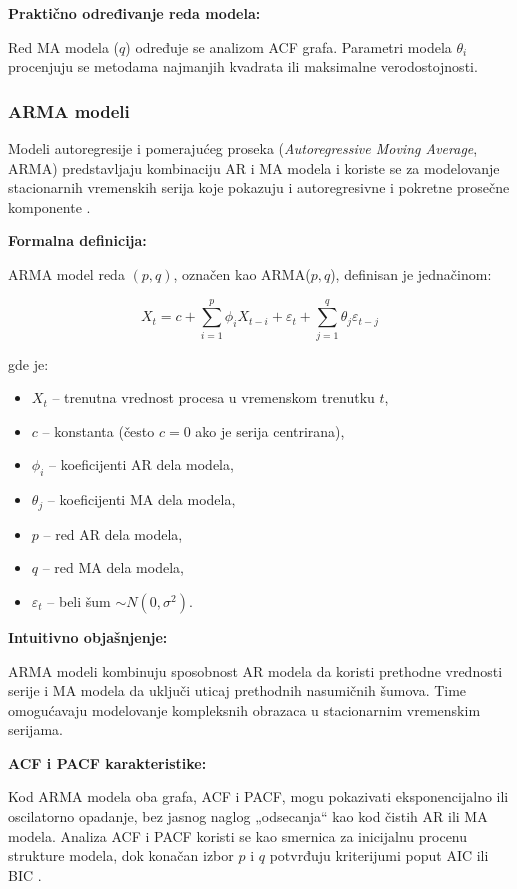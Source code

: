 \documentclass[12pt]{article}
\begin{document}
\noindent\textbf{Praktično određivanje reda modela:}

Red MA modela ($q$) određuje se analizom ACF grafa. Parametri modela $\theta_i$ procenjuju se metodama najmanjih kvadrata ili maksimalne verodostojnosti.

\subsubsection{ARMA modeli}

Modeli autoregresije i pomerajućeg proseka (\textit{Autoregressive Moving Average}, ARMA) predstavljaju kombinaciju AR i MA modela i koriste se za modelovanje stacionarnih vremenskih serija koje pokazuju i autoregresivne i pokretne prosečne komponente \cite{box1970, brockwell2002}.

\textbf{Formalna definicija:}

ARMA model reda $(p,q)$, označen kao ARMA($p,q$), definisan je jednačinom:

\begin{equation}
X_t = c + \sum_{i=1}^{p} \phi_i X_{t-i}
           + \varepsilon_t
           + \sum_{j=1}^{q} \theta_j \varepsilon_{t-j}
\end{equation}

gde je:
\begin{itemize}
    \item $X_t$ -- trenutna vrednost procesa u vremenskom trenutku $t$,
    \item $c$ -- konstanta (često $c=0$ ako je serija centrirana),
    \item $\phi_i$ -- koeficijenti AR dela modela,
    \item $\theta_j$ -- koeficijenti MA dela modela,
    \item $p$ -- red AR dela modela,
    \item $q$ -- red MA dela modela,
    \item $\varepsilon_t$ -- beli šum $\sim N(0, \sigma^2)$.
\end{itemize}

\textbf{Intuitivno objašnjenje:}

ARMA modeli kombinuju sposobnost AR modela da koristi prethodne vrednosti serije i MA modela da uključi uticaj prethodnih nasumičnih šumova. Time omogućavaju modelovanje kompleksnih obrazaca u stacionarnim vremenskim serijama.

\textbf{ACF i PACF karakteristike:}

Kod ARMA modela oba grafa, ACF i PACF, mogu pokazivati eksponencijalno ili oscilatorno opadanje, bez jasnog naglog „odsecanja“ kao kod čistih AR ili MA modela. Analiza ACF i PACF koristi se kao smernica za inicijalnu procenu strukture modela, dok konačan izbor $p$ i $q$ potvrđuju kriterijumi poput AIC ili BIC \cite{box1970, brockwell2002}.
\end{document}
